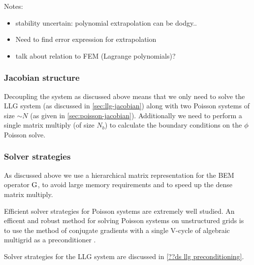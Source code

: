 Notes:
\begin{itemize}
\item stability uncertain: polynomial extrapolation can be dodgy..
\item Need to find error expression for extrapolation
\item talk about relation to FEM (Lagrange polynomials)?
\end{itemize}

\subsubsection{Jacobian structure}
\label{sec:bem-jacobian-structure}

Decoupling the system as discussed above means that we only need to solve the LLG system (as discussed in \autoref{sec:llg-jacobian}) along with two Poisson systems of size $\sim N$ (as given in \autoref{sec:poisson-jacobian}).
Additionally we need to perform a single matrix multiply (of size $N_b$) to calculate the boundary conditions on the $\phi$ Poisson solve.


\subsubsection{Solver strategies}
\label{sec:semi-implicit-bem-solver-strategies}

As discussed above we use a hierarchical matrix representation for the BEM operator ${\mathbf{\mathrm{G}}}$, to avoid large memory requirements and to speed up the dense matrix multiply.

Efficient solver strategies for Poisson systems are extremely well studied.
An efficent and robust method for solving Poisson systems on unstructured grids is to use the method of conjugate gradients with a single V-cycle of algebraic multigrid as a preconditioner \cite[Chap. 2]{HowardElmanDavidSilvester2006}.

Solver strategies for the LLG system are discussed in \autoref{??ds llg preconditioning}.


